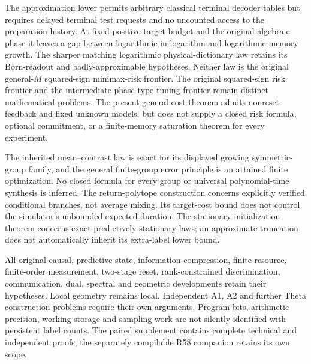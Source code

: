 The approximation lower permits arbitrary classical terminal
decoder tables but requires delayed terminal test requests and no
uncounted access to the preparation history.  At fixed positive target
budget and the original algebraic phase it leaves a gap between
logarithmic-in-logarithm and logarithmic memory growth.  The sharper
matching logarithmic physical-dictionary law retains its Born-readout
and badly-approximable hypotheses.  Neither law is the original
general-$M$ squared-sign minimax-risk frontier.  The original squared-sign risk frontier and the intermediate
phase-type timing frontier remain distinct mathematical problems.
The present general cost theorem admits nonreset feedback and fixed
unknown models, but does not supply a closed risk formula, optional
commitment, or a finite-memory saturation theorem for every experiment.

The inherited mean--contrast law is exact for its displayed growing
symmetric-group family, and the general finite-group error principle
is an attained finite optimization.  No closed formula for every group
or universal polynomial-time synthesis is inferred.  The return-polytope
construction concerns explicitly verified conditional branches, not
average mixing.  Its target-cost bound does not control the simulator's
unbounded expected duration.  The stationary-initialization theorem
concerns exact predictively stationary laws; an approximate truncation
does not automatically inherit its extra-label lower bound.

All original causal, predictive-state, information-compression, finite
resource, finite-order measurement, two-stage reset, rank-constrained
discrimination, communication, dual, spectral and geometric developments
retain their hypotheses.  Local geometry remains local.  Independent
A1, A2 and further Theta construction problems require their own
arguments.  Program bits, arithmetic precision, working storage and
sampling work are not silently identified with persistent label counts.
The paired supplement contains complete technical and independent
proofs; the separately compilable R58 companion retains its own scope.

\renewcommand{\bibliofont}{\footnotesize\setlength{\baselineskip}{10.8pt}}


